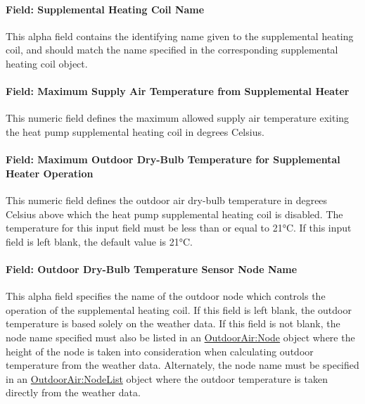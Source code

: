\paragraph{Field: Supplemental Heating Coil Name}\label{field-supplemental-heating-coil-name-3}

This alpha field contains the identifying name given to the supplemental heating coil, and should match the name specified in the corresponding supplemental heating coil object.

\paragraph{Field: Maximum Supply Air Temperature from Supplemental Heater}\label{field-maximum-supply-air-temperature-from-supplemental-heater-2}

This numeric field defines the maximum allowed supply air temperature exiting the heat pump supplemental heating coil in degrees Celsius.

\paragraph{Field: Maximum Outdoor Dry-Bulb Temperature for Supplemental Heater Operation}\label{field-maximum-outdoor-dry-bulb-temperature-for-supplemental-heater-operation-3}

This numeric field defines the outdoor air dry-bulb temperature in degrees Celsius above which the heat pump supplemental heating coil is disabled. The temperature for this input field must be less than or equal to 21°C. If this input field is left blank, the default value is 21°C.

\paragraph{Field: Outdoor Dry-Bulb Temperature Sensor Node Name}\label{field-outdoor-dry-bulb-temperature-sensor-node-name-1}

This alpha field specifies the name of the outdoor node which controls the operation of the supplemental heating coil. If this field is left blank, the outdoor temperature is based solely on the weather data. If this field is not blank, the node name specified must also be listed in an \hyperref[outdoorairnode]{OutdoorAir:Node} object where the height of the node is taken into consideration when calculating outdoor temperature from the weather data. Alternately, the node name must be specified in an \hyperref[outdoorairnodelist]{OutdoorAir:NodeList} object where the outdoor temperature is taken directly from the weather data.

